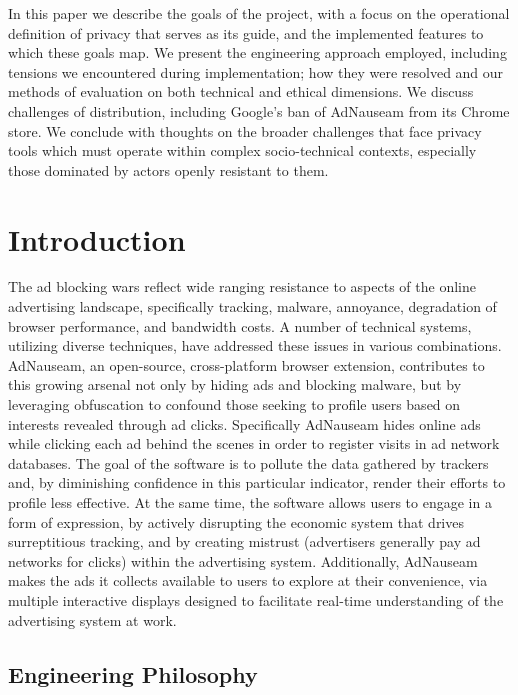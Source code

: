 \documentclass[conference]{IEEEtran}
\begin{document}
\indent In this paper we describe the goals of the project, with a focus on the operational definition of privacy that serves as its guide, and the implemented features to which these goals map. We present the engineering approach employed, including tensions we encountered during implementation; how they were resolved and our methods of evaluation on both technical and ethical dimensions. We discuss challenges of distribution, including Google's ban of AdNauseam from its Chrome store. We conclude with thoughts on the broader challenges that face privacy tools which must operate within complex socio-technical contexts, especially those dominated by actors openly resistant to them.

\section{Introduction}

The ad blocking wars \cite{Murphy} reflect wide ranging resistance to aspects of the online advertising landscape, specifically tracking, malware, annoyance, degradation of browser performance, and bandwidth costs. A number of technical systems, utilizing diverse techniques, have addressed these issues in various combinations. AdNauseam, an open-source, cross-platform browser extension, contributes to this growing arsenal not only by hiding ads and blocking malware, but by leveraging obfuscation to confound those seeking to profile users based on interests revealed through ad clicks. Specifically AdNauseam hides online ads while clicking each ad behind the scenes in order to register visits in ad network databases. The goal of the software is to pollute the data gathered by trackers and, by diminishing confidence in this particular indicator, render their efforts to profile less effective. At the same time, the software allows users to engage in a form of expression, by actively disrupting the economic system that drives surreptitious tracking, and by creating mistrust (advertisers generally pay ad networks for clicks) within the advertising system. Additionally, AdNauseam makes the ads it collects available to users to explore at their convenience, via multiple interactive displays designed to facilitate real-time understanding of the advertising system at work.


\subsection{Engineering Philosophy}
\end{document}
